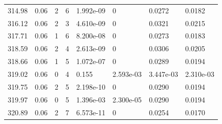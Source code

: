 \documentclass[preview]{standalone}
\begin{document}
{{{{{{{{\begin{tabular}{L{1.2cm}C{1.2cm} C{0.3cm}C{0.5cm} C{1.4cm}C{1.4cm} C{1.4cm}C{1.4cm}}
  314.98  &  0.06  & 2     &  6 &  1.992e-09  & 0  & 0.0272 &  0.0182   \\ 
  316.12  &  0.06  & 2     &  3 &  4.610e-09  & 0  & 0.0321 &  0.0215   \\ 
  317.71  &  0.06  & 1     &  6 &  8.200e-08  & 0  & 0.0273 &  0.0183   \\ 
  318.59  &  0.06  & 2     &  4 &  2.613e-09  & 0  & 0.0306 &  0.0205   \\ 
  318.66  &  0.06  & 1     &  5 &  1.072e-07  & 0  & 0.0289 &  0.0194   \\ 
  319.02  &  0.06  & 0     &  4 &  0.155  & 2.593e-03  & 3.447e-03 &  2.310e-03   \\ 
  319.75  &  0.06  & 2     &  5 &  2.198e-10  & 0  & 0.0290 &  0.0194   \\ 
  319.97  &  0.06  & 0     &  5 &  1.396e-03  & 2.300e-05  & 0.0290 &  0.0194   \\ 
  320.89  &  0.06  & 2     &  7 &  6.573e-11  & 0  & 0.0254 &  0.0170   \\ 
\hline 
\end{tabular} 

}}}}}}}}
\end{document}
